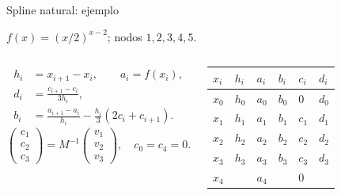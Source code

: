 \documentclass[original_version/main.tex]{subfiles}
\begin{document}
\begin{frame}[t]{Spline natural: ejemplo}
\par\noindent\begin{minipage}[t][9mm][t]{\textwidth}\small\strut $f(x)=(x/2)^{x-2}$; nodos $1,2,3,4,5$.\end{minipage}\par\nointerlineskip
\begin{columns}[T]\scriptsize\begin{align*}
h_i&=x_{i+1}-x_i,\qquad a_i=f(x_i),\\
d_i&=\frac{c_{i+1}-c_i}{3h_i},\\
b_i&=\frac{a_{i+1}-a_i}{h_i}-\frac{h_i}{3}(2c_i+c_{i+1}).
\end{align*}\scriptsize\[\begin{pmatrix}c_1\\c_2\\c_3\end{pmatrix}=M^{-1}\begin{pmatrix}v_1\\v_2\\v_3\end{pmatrix},\quad c_0=c_4=0.\]\begin{minipage}[t]{\textwidth}\begingroup\scriptsize\setlength{\tabcolsep}{2pt}\begin{center}\begin{tabular}{|C{.12\textwidth}|C{.12\textwidth}|C{.12\textwidth}|C{.12\textwidth}|C{.12\textwidth}|C{.12\textwidth}|}\hline
\rule[-2mm]{0pt}{6mm}$x_i$&$h_i$&$a_i$&$b_i$&$c_i$&$d_i$\\\hline
\rule[-2.5mm]{0pt}{7mm}$x_0$&$h_0$&$a_0$&$b_0$&$0$&$d_0$\\\hline
\rule[-2.5mm]{0pt}{7mm}$x_1$&$h_1$&$a_1$&$b_1$&$c_1$&$d_1$\\\hline
\rule[-2.5mm]{0pt}{7mm}$x_2$&$h_2$&$a_2$&$b_2$&$c_2$&$d_2$\\\hline
\rule[-2.5mm]{0pt}{7mm}$x_3$&$h_3$&$a_3$&$b_3$&$c_3$&$d_3$\\\hline
\rule[-2.5mm]{0pt}{7mm}$x_4$&&$a_4$&&$0$&\\\hline
\end{tabular}\end{center}\endgroup\end{minipage}\par
\end{columns}
\end{frame}
\end{document}
